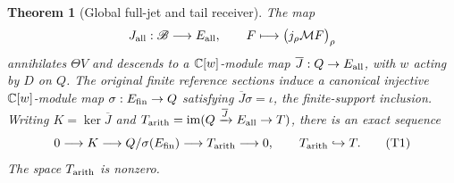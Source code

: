 \documentclass[11pt]{article}
\newtheorem{theorem}{Theorem}[section]
\begin{document}
\begin{theorem}[Global full-jet and tail receiver]\label{thm:global-tail}
The map
\[
 J_{\rm all}:\mathscr B\longrightarrow E_{\rm all},\qquad
 F\longmapsto\bigl(j_\rho\mathcal M F\bigr)_\rho
\]
annihilates $\Theta V$ and descends to a $\mathbb C[w]$-module map
$\overline J:Q\to E_{\rm all}$, with $w$ acting by $D$ on $Q$.
The original finite reference sections induce a canonical injective
$\mathbb C[w]$-module map $\sigma:E_{\rm fin}\to Q$ satisfying
$\overline J\sigma=\iota$, the finite-support inclusion.
Writing $K=\ker\overline J$ and
$T_{\rm arith}=\operatorname{im}(Q\xrightarrow{\overline J}
E_{\rm all}\to T)$, there is an exact sequence
\[
 0\longrightarrow K\longrightarrow Q/\sigma(E_{\rm fin})
       \longrightarrow T_{\rm arith}\longrightarrow0,
 \qquad T_{\rm arith}\hookrightarrow T.\tag{T1}
\]
The space $T_{\rm arith}$ is nonzero.
\end{theorem}
\end{document}
